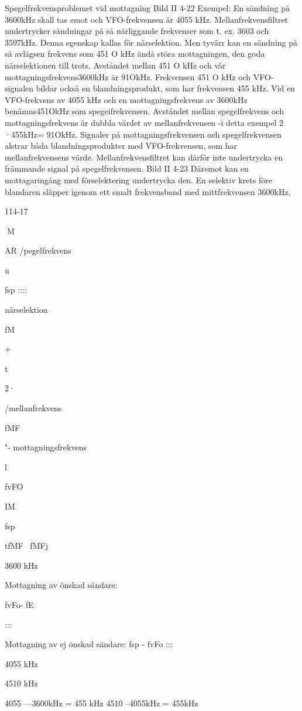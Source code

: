 \documentclass[a4paper,twoside,twocolumn,openright]{book}
\begin{document}
{{{Spegelfrekvensproblemet vid mottagning
Bild II 4-22
Exempel:
En sändning på 3600kHz skall tas emot och
VFO-frekvensen är 4055 kHz. Mellanfrekvensfiltret undertrycker sändningar på så
närliggande frekvenser som t. ex. 3603 och
3597kHz. Denna egenskap kallas för närselektion.
Men tyvärr kan en sändning på så avlägsen frekvens som 451 O kHz ändå störa
mottagningen, den goda närselektionen till
trots. Avståndet mellan 451 O kHz och vår
mottagningsfrekvens3600kHz är 91OkHz.
Frekvensen 451 O kHz och VFO-signalen
bildar också en blandningsprodukt, som har
frekvensen 455 kHz. Vid en VFO-frekvens
av 4055 kHz och en mottagningsfrekvens
av 3600kHz benämns451OkHz som spegeifrekvensen. Avståndet mellan spegelfrekvens och mottagningsfrekvens är dubbla
värdet av mellanfrekvensen -i detta exempel 2 ·455kHz= 91OkHz.
Signaler på mottagningsfrekvensen och
spegelfrekvensen alstrar båda blandningsprodukter med VFO-frekvensen, som har
mellanfrekvensens värde. Mellanfrekvensfiltret kan därför inte undertrycka en främmande signal på spegelfrekvensen.
Bild II 4-23
Däremot kan en mottagaringång med
förselektering undertrycka den. En selektiv
krets före blandaren släpper igenom ett smalt
frekvensband med mittfrekvensen 3600kHz,

114-17

M

AR
/pegelfrekvens

u

fsp ::::

närselektion

fM

+

t

2·

/mellanfrekvens

fMF

"- mottagningsfrekvens

l

fvFO

IM

fsp

tfMF ~fMFj

3600
kHz

Mottagning av önskad sändare:

fvFo- fE

:::

Mottagning av ej önskad sändare: fsp - fvFo :::

4055
kHz

4510
kHz

4055 ---3600kHz = 455 kHz
4510 --4055kHz = 455kHz

}}}
\end{document}

